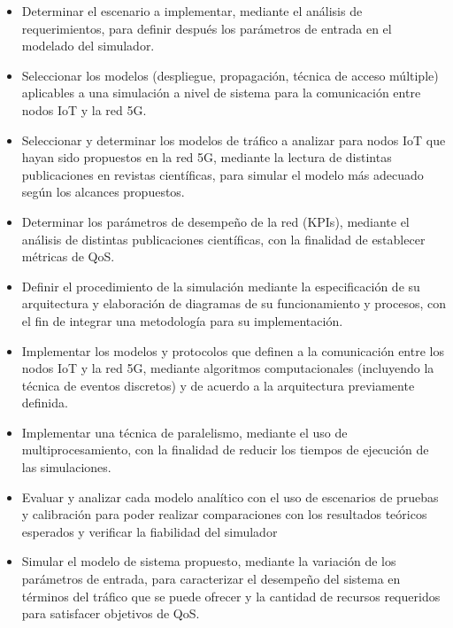 \begin{itemize}
    \item Determinar el escenario a implementar, mediante el análisis de requerimientos, para definir después los parámetros de entrada en el modelado del simulador.
    \item Seleccionar los modelos (despliegue, propagación, técnica de acceso múltiple) aplicables a una simulación a nivel de sistema para la comunicación entre nodos IoT y la red 5G.
    \item Seleccionar y determinar los modelos de tráfico a analizar para nodos IoT que hayan sido propuestos en la red 5G, mediante la lectura de distintas publicaciones en revistas científicas, para simular el modelo más adecuado según los alcances propuestos.
    \item Determinar los parámetros de desempeño de la red (KPIs), mediante el análisis de distintas publicaciones científicas, con la finalidad de establecer métricas de QoS.
    \item Definir el procedimiento de la simulación mediante la especificación de su arquitectura y elaboración de diagramas de su funcionamiento y procesos, con el fin de integrar una metodología para su implementación.
    \item Implementar los modelos y protocolos que definen a la comunicación entre los nodos IoT y la red 5G, mediante algoritmos computacionales (incluyendo la técnica de eventos discretos) y de acuerdo a la arquitectura previamente definida.
    \item Implementar una técnica de paralelismo, mediante el uso de multiprocesamiento, con la finalidad de reducir los tiempos de ejecución de las simulaciones.
    \item Evaluar y analizar cada modelo analítico con el uso de escenarios de pruebas y calibración para poder realizar comparaciones con los resultados teóricos esperados y verificar la fiabilidad del simulador 
    \item Simular el modelo de sistema propuesto, mediante la variación de los parámetros de entrada, para caracterizar el desempeño del sistema en términos del tráfico que se puede ofrecer y la cantidad de recursos requeridos para satisfacer objetivos de QoS.
\end{itemize}


